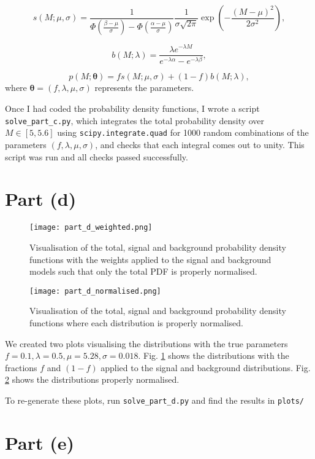 \documentclass{article}
\begin{document}
$$
s(M; \mu, \sigma) = 
\frac{1}{\Phi(\frac{\beta-\mu}{\sigma}) - \Phi(\frac{\alpha-\mu}{\sigma})}
\frac{1}{\sigma\sqrt{2\pi}}
\exp\left(-\frac{(M - \mu)^2}{2\sigma^2}\right),
$$

$$
b(M; \lambda) = 
\frac{\lambda e^{-\lambda M}}
{e^{-\lambda\alpha} - e^{-\lambda\beta}},
$$

$$
p(M; \boldsymbol{\theta}) = fs(M; \mu, \sigma) + (1-f)b(M; \lambda),
$$
where $\boldsymbol{\theta} = (f, \lambda, \mu, \sigma)$ represents the parameters.

Once I had coded the probability density functions, I wrote a script \texttt{solve\_part\_c.py}, which integrates the total probability density over $M \in [5, 5.6]$ using \texttt{scipy.integrate.quad} for 1000 random combinations of the parameters $(f, \lambda, \mu, \sigma)$, and checks that each integral comes out to unity. This script was run and all checks passed successfully.

\section*{Part (d)}

\begin{figure}[h]
\centering
\texttt{[image: part\_d\_weighted.png]}
\caption{Visualisation of the total, signal and background probability density functions with the weights applied to the signal and background models such that only the total PDF is properly normalised.}
\label{fig:dWeighted}
\end{figure}

\begin{figure}[h]
\centering
\texttt{[image: part\_d\_normalised.png]}
\caption{Visualisation of the total, signal and background probability density functions where each distribution is properly normalised.}
\label{fig:dNorm}
\end{figure}

We created two plots visualising the distributions with the true parameters $f = 0.1, \lambda = 0.5, \mu = 5.28, \sigma = 0.018$. Fig. \ref{fig:dWeighted} shows the distributions with the fractions $f$ and $(1-f)$ applied to the signal and background distributions. Fig. \ref{fig:dNorm} shows the distributions properly normalised.  

To re-generate these plots, run \texttt{solve\_part\_d.py} and find the results in \texttt{plots/}

\section*{Part (e)}
\end{document}
